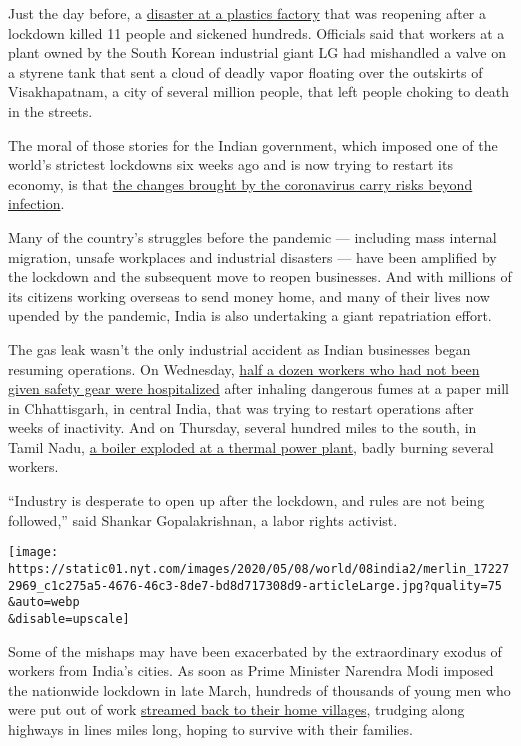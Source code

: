 Just the day before, a
\href{https://www.nytimes.com/2020/05/07/world/asia/india-lg-gas.html}{disaster
at a plastics factory} that was reopening after a lockdown killed 11
people and sickened hundreds. Officials said that workers at a plant
owned by the South Korean industrial giant LG had mishandled a valve on
a styrene tank that sent a cloud of deadly vapor floating over the
outskirts of Visakhapatnam, a city of several million people, that left
people choking to death in the streets.

The moral of those stories for the Indian government, which imposed one
of the world's strictest lockdowns six weeks ago and is now trying to
restart its economy, is that
\href{https://www.nytimes.com/2020/05/06/world/asia/india-coronavirus-lockdown-infections.html}{the
changes brought by the coronavirus carry risks beyond infection}.

Many of the country's struggles before the pandemic --- including mass
internal migration, unsafe workplaces and industrial disasters --- have
been amplified by the lockdown and the subsequent move to reopen
businesses. And with millions of its citizens working overseas to send
money home, and many of their lives now upended by the pandemic, India
is also undertaking a giant repatriation effort.

The gas leak wasn't the only industrial accident as Indian businesses
began resuming operations. On Wednesday,
\href{https://www.ndtv.com/india-news/gas-leak-at-paper-mill-in-chhattisgarhs-raigarh-hours-after-vizag-incident-2225018}{half
a dozen workers who had not been given safety gear were hospitalized}
after inhaling dangerous fumes at a paper mill in Chhattisgarh, in
central India, that was trying to restart operations after weeks of
inactivity. And on Thursday, several hundred miles to the south, in
Tamil Nadu,
\href{https://timesofindia.indiatimes.com/city/puducherry/8-injured-in-neyveli-boiler-blast-2-critical/articleshow/75611875.cms}{a
boiler exploded at a thermal power plant}, badly burning several
workers.

``Industry is desperate to open up after the lockdown, and rules are not
being followed,'' said Shankar Gopalakrishnan, a labor rights activist.

\texttt{[image: https://static01.nyt.com/images/2020/05/08/world/08india2/merlin\_172272969\_c1c275a5-4676-46c3-8de7-bd8d717308d9-articleLarge.jpg?quality=75\\\&auto=webp\\\&disable=upscale]}

Some of the mishaps may have been exacerbated by the extraordinary
exodus of workers from India's cities. As soon as Prime Minister
Narendra Modi imposed the nationwide lockdown in late March, hundreds of
thousands of young men who were put out of work
\href{https://www.nytimes.com/2020/03/29/world/asia/coronavirus-india-migrants.html}{streamed
back to their home villages}, trudging along highways in lines miles
long, hoping to survive with their families.

